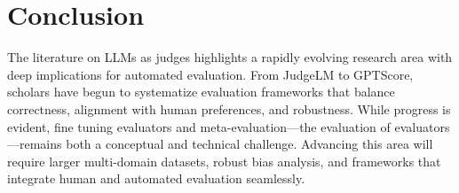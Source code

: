 
\section{Conclusion}
The literature on LLMs as judges highlights a rapidly evolving research area with deep implications for automated evaluation. From JudgeLM to GPTScore, scholars have begun to systematize evaluation frameworks that balance correctness, alignment with human preferences, and robustness. While progress is evident, fine tuning evaluators and meta-evaluation—the evaluation of evaluators—remains both a conceptual and technical challenge. Advancing this area will require larger multi-domain datasets, robust bias analysis, and frameworks that integrate human and automated evaluation seamlessly.~\nocite{li2024_llmsasjudges}